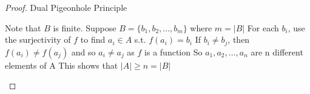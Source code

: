 \documentclass[a4paper]{article}
\theoremstyle{definition}
\begin{document}
\begin{proof} Dual Pigeonhole Principle
  \begin{numpf}
    \pfln Note that $B$ is finite. Suppose $B = \{b_1, b_2, ..., b_m\}$ where $m = |B|$
    \pfln For each $b_i$, use the surjectivity of $f$ to find $a_i \in A$ s.t. $f(a_i) = b_i$
    \pfln If $b_i \neq b_j$, then $f(a_i) \neq f(a_j)$ and so $a_i \neq a_j$ as $f$ is a function
    \pfln So $a_1, a_2, ..., a_n$ are n different elements of A
    \pfln This shows that $|A| \geq n = |B|$
  \end{numpf}
\end{proof}
\end{document}
